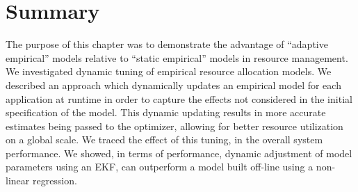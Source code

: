 \section{Summary}  
\label{sec:future-work}
The purpose of this chapter was to demonstrate the advantage of ``adaptive empirical'' models relative to ``static empirical'' models in resource management.  
We investigated dynamic tuning of empirical resource allocation models. 
We described an approach which dynamically updates an empirical model for each application at runtime in order to capture the effects not considered in the initial specification of the model. 
This dynamic updating results in more accurate estimates being passed to the optimizer, allowing for better resource utilization on a global scale.  
We traced the effect of this tuning, in the overall system performance. We showed, in terms of performance, dynamic adjustment of model parameters using an EKF, can outperform a model built off-line using a non-linear regression. 




